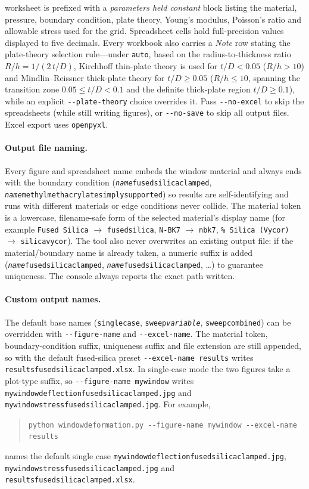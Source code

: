 \documentclass[11pt]{article}
\newcommand{\codeus}{\textunderscore\allowbreak}
\DeclareRobustCommand{\code}[1]{\texttt{\ifmmode\else\renewcommand{\_}{\codeus}\fi#1}}
\begin{document}
worksheet is prefixed with a \emph{parameters held constant} block listing the
material, pressure, boundary condition, plate theory, Young's modulus, Poisson's
ratio and allowable stress used for the grid.
Spreadsheet cells hold full-precision values displayed to five
decimals. Every workbook also carries a \emph{Note} row stating the
plate-theory selection rule---under \code{auto}, based on the radius-to-thickness
ratio $R/h = 1/(2\,t/D)$, Kirchhoff thin-plate theory is used for
$t/D < \num{0.05}$ ($R/h > 10$) and Mindlin--Reissner thick-plate theory for
$t/D \ge \num{0.05}$ ($R/h \le 10$, spanning the transition zone
$\num{0.05}\le t/D<\num{0.1}$ and the definite thick-plate region $t/D\ge\num{0.1}$),
while an explicit \code{-{}-plate-theory} choice overrides it.
Pass \code{-{}-no-excel} to skip the spreadsheets (while still writing
figures), or \code{-{}-no-save} to skip all output files. Excel export uses
\code{openpyxl}.

\paragraph{Output file naming.} Every figure and spreadsheet name embeds the
window material and always ends with the boundary condition
(\code{\textit{name}\_fused\_silica\_clamped},
\code{\textit{name}\_methyl\_methacrylate\_simply\_supported}) so results are
self-identifying and runs with different materials or edge conditions never
collide. The material token is a lowercase, filename-safe form of the selected
material's display name (for example \code{Fused Silica}
$\rightarrow$ \code{fused\_silica}, \code{N-BK7} $\rightarrow$ \code{n\_bk7},
\code{96\% Silica (Vycor)} $\rightarrow$ \code{96\_silica\_vycor}). The tool
also never overwrites an existing output file: if the material/boundary name is
already taken, a numeric suffix is added
(\code{\textit{name}\_fused\_silica\_clamped\_1},
\code{\textit{name}\_fused\_silica\_clamped\_2}, \ldots) to guarantee
uniqueness. The console always reports the exact path written.

\paragraph{Custom output names.} The default base names (\code{single\_case},
\code{sweep\_\textit{variable}}, \code{sweep\_combined}) can be overridden with
\code{-{}-figure-name} and \code{-{}-excel-name}. The material token,
boundary-condition suffix, uniqueness suffix and file extension are still
appended, so with the default fused-silica preset \code{-{}-excel-name results}
writes \code{results\_fused\_silica\_clamped.xlsx}. In single-case
mode the two figures take a plot-type suffix, so \code{-{}-figure-name mywindow}
writes \code{mywindow\_deflection\_fused\_silica\_clamped.jpg} and
\code{mywindow\_stress\_fused\_silica\_clamped.jpg}. For example,
\begin{quote}
\code{python window\_deformation.py -{}-figure-name mywindow -{}-excel-name results}
\end{quote}
names the default single case \code{mywindow\_deflection\_fused\_silica\_clamped.jpg},
\code{mywindow\_stress\_fused\_silica\_clamped.jpg} and
\code{results\_fused\_silica\_clamped.xlsx}.
\end{document}
